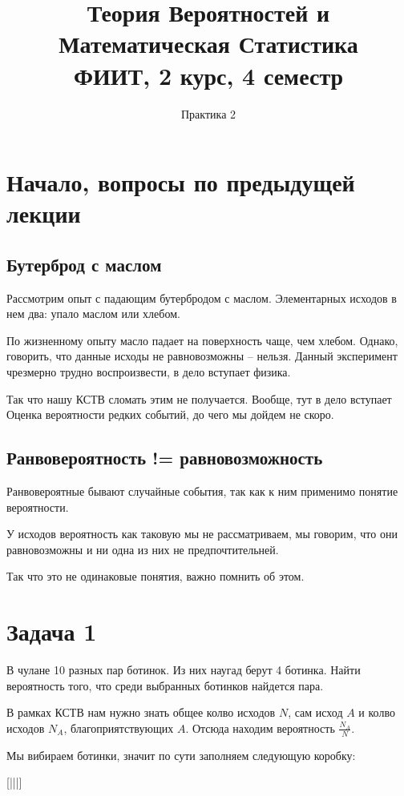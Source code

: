 \documentclass{article}
\title{Теория Вероятностей и Математическая Статистика\\
ФИИТ, 2 курс, 4 семестр}
\author{Практика 2}
\begin{document}
\maketitle

\section{Начало, вопросы по предыдущей лекции}

\subsection{Бутерброд с маслом}

Рассмотрим опыт с падающим бутербродом с маслом. Элементарных исходов в нем два: упало маслом или хлебом.

По жизненному опыту масло падает на поверхность чаще, чем хлебом. Однако, говорить, что данные исходы не равновозможны -- нельзя. Данный эксперимент чрезмерно трудно воспроизвести, в дело вступает физика.

Так что нашу КСТВ сломать этим не получается. Вообще, тут в дело вступает Оценка вероятности редких событий, до чего мы дойдем не скоро.

\subsection{Ранвовероятность != равновозможность}

Ранвовероятные бывают случайные события, так как к ним применимо понятие вероятности.

У исходов вероятность как таковую мы не рассматриваем, мы говорим, что они равновозможны и ни одна из них не предпочтительней.

Так что это не одинаковые понятия, важно помнить об этом.

\section{Задача 1}

В чулане 10 разных пар ботинок. Из них наугад берут 4 ботинка. Найти вероятность того, что среди выбранных ботинков найдется пара.

\quad

В рамках КСТВ нам нужно знать общее колво исходов $N$, сам исход $A$ и колво исходов $N_A$, благоприятствующих $A$. Отсюда находим вероятность $\frac{N_A}{N}$.

Мы вибираем ботинки, значит по сути заполняем следующую коробку:
\begin{center}
  [\quad|\quad|\quad|\quad]
\end{center}
\end{document}
